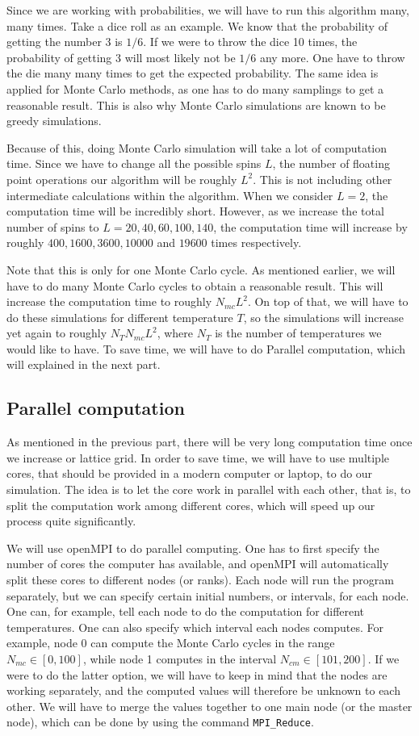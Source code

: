 \documentclass[12pt]{article}
\begin{document}
Since we are working with probabilities, we will have to run this algorithm many, many times. Take a dice roll as an example. We know that the probability of getting the number 3 is $1/6$. If we were to throw the dice 10 times, the probability of getting 3 will most likely not be $1/6$ any more. One have to throw the die many many times to get the expected probability. The same idea is applied for Monte Carlo methods, as one has to do many samplings to get a reasonable result. This is also why Monte Carlo simulations are known to be greedy simulations.

Because of this, doing Monte Carlo simulation will take a lot of computation time. Since we have to change all the possible spins $L$, the number of floating point operations our algorithm will be roughly $L^2$. This is not including other intermediate calculations within the algorithm. When we consider $L = 2$, the computation time will be incredibly short. However, as we increase the total number of spins to $L = 20, 40, 60, 100, 140$, the computation time will increase by roughly $400, 1600, 3600, 10 000$ and $19 600$ times respectively.

Note that this is only for one Monte Carlo cycle. As mentioned earlier, we will have to do many Monte Carlo cycles to obtain a reasonable result. This will increase the computation time to roughly $N_{mc} L^2$. On top of that, we  will have to do these simulations for different temperature $T$, so the simulations will increase yet again to roughly $N_T N_{mc} L^2$, where $N_T$ is the number of temperatures we would like to have. To save time, we will have to do Parallel computation, which will explained in the next part.

\subsection{Parallel computation}
As mentioned in the previous part, there will be very long computation time once we increase or lattice grid. In order to save time, we will have to use multiple cores, that should be provided in a modern computer or laptop, to do our simulation. The idea is to let the core work in parallel with each other, that is, to split the computation work among different cores, which will speed up our process quite significantly.

We will use openMPI to do parallel computing. One has to first specify the number of cores the computer has available, and openMPI will automatically split these cores to different nodes (or ranks). Each node will run the program separately, but we can specify certain initial numbers, or intervals, for each node. One can, for example, tell each node to do the computation for different temperatures. One can also specify which interval each nodes computes. For example, node 0 can compute the Monte Carlo cycles in the range $N_{mc} \in [0,100]$, while node 1 computes in the interval $N_{cm} \in [101, 200]$. If we were to do the latter option, we will have to keep in mind that the nodes are working separately, and the computed values will therefore be unknown to each other. We will have to merge the values together to one main node (or the master node), which can be done by using the command \texttt{MPI\_Reduce}.
\end{document}
